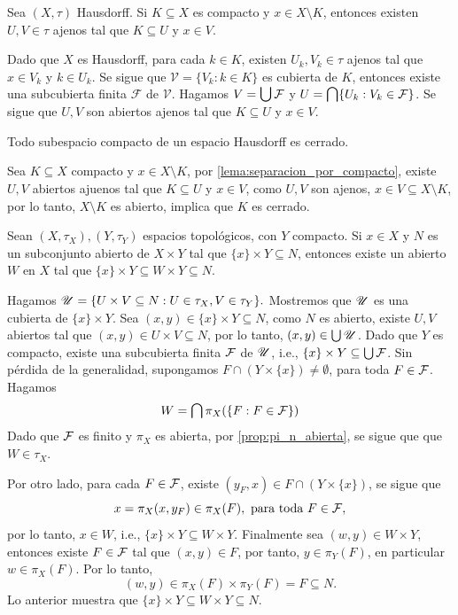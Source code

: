 \begin{lema}
\label{lema:separacion_por_compacto}
    Sea $(X,\tau)$ Hausdorff. Si $K\subseteq X$ es compacto y $x\in X\setminus K$, entonces existen $U,V\in\tau$ ajenos tal que $K\subseteq U$ y  $x\in V$.
\end{lema}
\begin{dem}
    Dado que $X$ es Hausdorff, para cada $k\in K$, existen $U_k,V_k\in \tau$ ajenos tal que $x\in V_k$ y $k\in U_k$. Se sigue que $\mathscr{V}=\{V_k:k\in K\}$ es cubierta de $K$, entonces existe una subcubierta finita $\mathcal{F}$ de $\mathscr{V}$. Hagamos $V=\medcup\mathcal{F}$ y $U=\medcap\{U_k:V_k\in \mathcal{F}\}$. Se sigue que $U,V$ son abiertos ajenos tal que $K\subseteq U$ y  $x\in V$.
\end{dem}
\begin{coro}
\label{coro:compacto_de_T_1_cerrado}
    Todo subespacio compacto de un espacio Hausdorff es cerrado.
\end{coro}
\begin{dem}
    Sea $K\subseteq X$ compacto y $x\in X\setminus K$, por \ref{lema:separacion_por_compacto}, existe $U,V$ abiertos ajuenos tal que $K\subseteq U$ y $x\in V$, como $U,V$ son ajenos, $x\in V\subseteq X\setminus K$, por lo tanto, $X\setminus K$ es abierto, implica que $K$ es cerrado.
\end{dem}
\begin{lema}
\label{lema:del tubo}
    Sean $(X,\tau_X),(Y,\tau_Y)$ espacios topológicos, con $Y$ compacto. Si $x\in X$ y $N$ es un subconjunto abierto de $X\times Y$ tal que $\{x\}\times Y\subseteq N$, entonces existe un abierto $W$ en $X$ tal que $\{x\}\times Y\subseteq W\times Y\subseteq N$.
\end{lema}
\begin{dem}
    Hagamos $\mathscr{U}=\{U\times V\subseteq N:U\in \tau_X, V\in\tau_Y\}.$ Mostremos que $\mathscr{U}$ es una cubierta de $\{x\}\times Y$. Sea $(x,y)\in \{x\}\times Y\subseteq N$, como $N$ es abierto, existe $U,V$ abiertos tal que $(x,y)\in U\times V\subseteq N$, por lo tanto, $(x,y)\in \bigcup\mathscr{U}$. Dado que $Y$ es compacto, existe una subcubierta finita $\mathcal{F}$ de $\mathscr{U}$, i.e., $\{x\}\times Y\subseteq\bigcup\mathcal{F}$. 
    Sin pérdida de la generalidad, supongamos $F\cap (Y\times\{x\})\neq \emptyset$, para toda $F\in \mathcal{F}$. Hagamos
    \[
    W=\medcap\pi_X(\{F:F\in\F\})
    \]
    Dado que $\mathcal{F}$ es finito y $\pi_X$ es abierta, por \ref{prop:pi_n_abierta}, se sigue que que $W\in\tau_X$.
    
    Por otro lado, para cada $F\in\mathcal{F}$, existe $(y_F,x)\in F\cap (Y\times\{x\})$, se sigue que $$x=\pi_X(x,y_F)\in\pi_X(F), \text{ para toda } F\in \mathcal{F},$$ 
    por lo tanto, $x\in W$, i.e.,  $\{x\}\times Y\subseteq W\times Y$. Finalmente sea $(w,y)\in W\times Y$, entonces existe $F\in\mathcal{F}$ tal que $(x,y)\in F$, por tanto, $y\in\pi_Y(F)$, en particular $w\in \pi_X(F)$. Por lo tanto, $$(w,y)\in\pi_X(F)\times\pi_Y(F)=F\subseteq N.$$
    Lo anterior muestra que $\{x\}\times Y\subseteq W\times Y\subseteq N$.
\end{dem}

